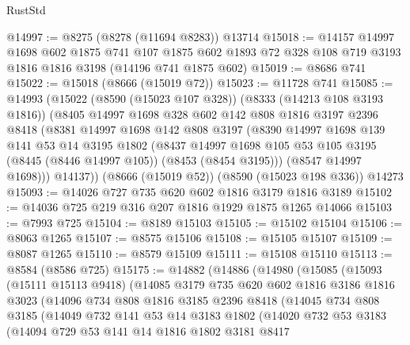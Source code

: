 \begin{lexlean}{RustStd}
\begin{coremodule}
@14997 := @8275 (@8278 (@11694 @8283)) @13714
@15018 := @14157
    @14997
    @1698
    @602
    @1875
    @741
    @107
    @1875
    @602
    @1893
    @72
    @328
    @108
    @719
    @3193
    @1816
    @1816
    @3198
    (@14196 @741 @1875 @602)
@15019 := @8686 @741
@15022 := @15018 (@8666 (@15019 @72))
@15023 := @11728 @741
@15085 := @14993
    (@15022
      (@8590 (@15023 @107 @328))
      (@8333 (@14213 @108 @3193 @1816))
      (@8405
        @14997
        @1698
        @328
        @602
        @142
        @808
        @1816
        @3197
        @2396
        @8418
        (@8381
          @14997
          @1698
          @142
          @808
          @3197
          (@8390
            @14997
            @1698
            @139
            @141
            @53
            @14
            @3195
            @1802
            (@8437
              @14997
              @1698
              @105
              @53
              @105
              @3195
              (@8445 (@8446 @14997 @105))
              (@8453 (@8454 @3195)))
            (@8547 @14997 @1698)))
        @14137))
    (@8666 (@15019 @52))
    (@8590 (@15023 @198 @336))
    @14273
@15093 := @14026 @727 @735 @620 @602 @1816 @3179 @1816 @3189
@15102 := @14036 @725 @219 @316 @207 @1816 @1929 @1875 @1265 @14066
@15103 := @7993 @725
@15104 := @8189 @15103
@15105 := @15102 @15104
@15106 := @8063 @1265
@15107 := @8575 @15106
@15108 := @15105 @15107
@15109 := @8087 @1265
@15110 := @8579 @15109
@15111 := @15108 @15110
@15113 := @8584 (@8586 @725)
@15175 := @14882
    (@14886
      (@14980
        (@15085
          (@15093
            (@15111 @15113 @9418)
            (@14085
              @3179
              @735
              @620
              @602
              @1816
              @3186
              @1816
              @3023
              (@14096
                @734
                @808
                @1816
                @3185
                @2396
                @8418
                (@14045
                  @734
                  @808
                  @3185
                  (@14049
                    @732
                    @141
                    @53
                    @14
                    @3183
                    @1802
                    (@14020
                      @732
                      @53
                      @3183
                      (@14094
                        @729
                        @53
                        @141
                        @14
                        @1816
                        @1802
                        @3181
                        @8417

\end{coremodule}
\end{lexlean}

